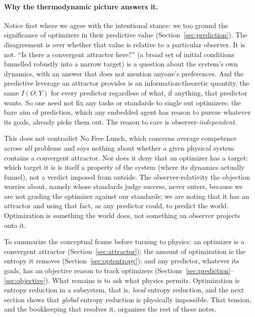 \documentclass[10pt]{article}
\theoremstyle{definition}
\theoremstyle{remark}
\begin{document}
\paragraph{Why the thermodynamic picture answers it.} Notice first where we agree with the intentional stance: we too ground the significance of optimizers in their predictive value (Section~\ref{sec:prediction}). The disagreement is over whether that value is relative to a particular observer. It is not. ``Is there a convergent attractor here?'' (a broad set of initial conditions funnelled robustly into a narrow target) is a question about the system's own dynamics, with an answer that does not mention anyone's preferences. And the predictive leverage an attractor provides is an information-theoretic quantity, the same $I(O;Y)$ for every predictor regardless of what, if anything, that predictor wants. So one need not fix any tasks or standards to single out optimizers: the bare aim of prediction, which any embedded agent has reason to pursue whatever its goals, already picks them out. The reason to care is observer-\emph{independent}.

This does not contradict No Free Lunch, which concerns average competence across \emph{all} problems and says nothing about whether a given physical system contains a convergent attractor. Nor does it deny that an optimizer has a target: which target it is is itself a property of the system (where its dynamics actually funnel), not a verdict imposed from outside. The observer-relativity the objection worries about, namely whose standards judge success, never enters, because we are not grading the optimizer against our standards; we are noting that it has an attractor and using that fact, as any predictor could, to predict the world. Optimization is something the world does, not something an observer projects onto it.

To summarize the conceptual frame before turning to physics: an optimizer is a convergent attractor (Section~\ref{sec:attractor}); the amount of optimization is the entropy it removes (Section~\ref{sec:optentropy}); and any predictor, whatever its goals, has an objective reason to track optimizers (Sections~\ref{sec:prediction}--\ref{sec:objective}). What remains is to ask what physics permits. Optimization is entropy reduction in a subsystem, that is, \emph{local} entropy reduction, and the next section shows that \emph{global} entropy reduction is physically impossible. That tension, and the bookkeeping that resolves it, organizes the rest of these notes.
\end{document}
